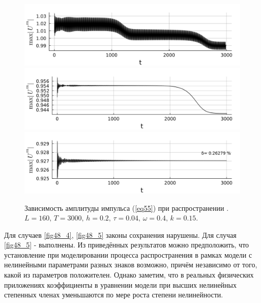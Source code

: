 \documentclass[14pt,a4paper]{extreport}
\begin{document}
			\begin{figure}[H] %
				\begin{minipage}[h]{0.8\linewidth}
					\includegraphics[width=1\linewidth]{fig37.png}
					\label{fig48_4}
					\includegraphics[width=1\linewidth]{fig71.png}
					\label{fig48_5}
					\includegraphics[width=1\linewidth]{fig83.png}
					\label{fig48_6}
				\end{minipage}
				\caption{Зависимость амплитуды импульса (\ref{eq55}) при распространении .
				\(L=160,\, T=3000,\, h=0.2,\, \tau=0.04,\, \omega=0.4,\, k=0.15\).}
				\label{fig482}
			\end{figure}

			Для случаев \ref{fig48_4}, \ref{fig48_5} законы сохранения нарушены. Для случая \ref{fig48_5} - выполнены. Из приведённых результатов можно предположить, что установление при моделировании процесса распространения в рамках модели с нелинейными параметрами разных знаков возможно, причём независимо от того, какой из параметров положителен. Однако заметим, что в реальных физических приложениях коэффициенты в уравнении модели при высших нелинейных степенных членах уменьшаются по мере роста степени нелинейности. 
			
\end{document}
